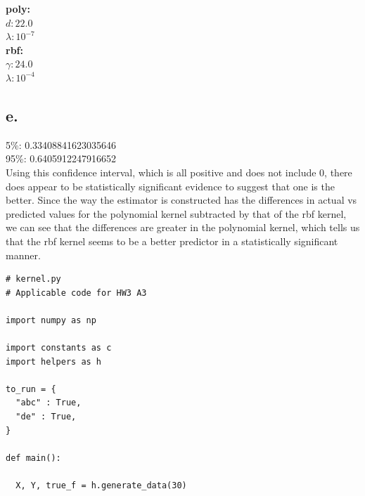 \documentclass{article}
\newcommand{\1}{\mathbf{1}}
\begin{document}
{\begin{figure}[h]
\end{figure} 
\newpage
\textbf{poly:} \\
$d: 22.0$ \\
$\lambda: 10^{-7}$ \\ 
\textbf{rbf:} \\
$\gamma: 24.0$ \\
$\lambda: 10^{-4}$

\subsection*{e.}

5\%: 0.33408841623035646 \\
95\%: 0.6405912247916652 \\
Using this confidence interval, which is all positive and does not include 0, there does appear to be statistically significant evidence to suggest that one is the better. Since the way the estimator is constructed has the differences in actual vs predicted values for the polynomial kernel subtracted by that of the rbf kernel, we can see that the differences are greater in the polynomial kernel, which tells us that the rbf kernel seems to be a better predictor in a statistically significant manner.

\begin{verbatim}
# kernel.py
# Applicable code for HW3 A3

import numpy as np

import constants as c
import helpers as h

to_run = {
  "abc" : True,
  "de" : True,
}

def main():

  X, Y, true_f = h.generate_data(30)


\end{verbatim}}
\end{document}
